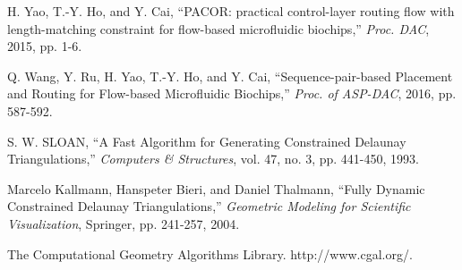 \documentclass[journal]{IEEEtran}
\begin{document}
\begin{thebibliography}{99}
{
H. Yao, T.-Y. Ho, and Y. Cai, 
``PACOR: practical control-layer routing flow with length-matching constraint for flow-based microfluidic biochips,'' 
{\em Proc. DAC},
2015, pp. 1-6.

Q. Wang, Y. Ru, H. Yao, T.-Y. Ho, and Y. Cai,
``Sequence-pair-based Placement and Routing for Flow-based Microfluidic Biochips,''
{\em Proc. of ASP-DAC},
2016, pp. 587-592.


S. W. SLOAN, 
``A Fast Algorithm for Generating Constrained Delaunay Triangulations,''
{\em Computers \& Structures}, 
vol. 47, no. 3, pp. 441-450, 1993.

Marcelo Kallmann, Hanspeter Bieri, and Daniel Thalmann, 
``Fully Dynamic Constrained Delaunay Triangulations,''
{\em Geometric Modeling for Scientific Visualization}, 
Springer, pp. 241-257, 2004.

The Computational Geometry Algorithms Library. http://www.cgal.org/.







}
\end{thebibliography}
\end{document}
